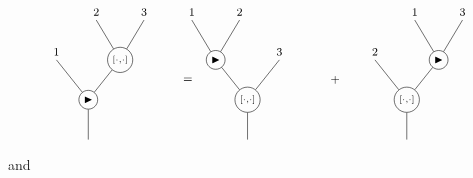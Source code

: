 \documentclass[10pt]{article}
\theoremstyle{definition}
\newcommand{\bt}{\blacktriangleright}
\begin{document}
\[
\footnotesize
\begin{tikzpicture}[scale=1]


\node[circle,draw,inner sep=2pt] (w) at (0,0) {$\bt$};

\node[circle,draw,inner sep=2pt] (b) at (0.8,1) {$\scriptstyle[\cdot,\cdot]$};

\draw (w) -- (0,-1);
\draw (-0.8,1) -- (w);
\draw (b) -- (w);
\draw (0.2,2) -- (b);
\draw (1.4,2) -- (b);

\node at (-0.8,1.2) {$1$};
\node at (0.2,2.2) {$2$};
\node at (1.4,2.2) {$3$};

\node at (2.5,0.5) {$=$};


\begin{scope}[shift={(4,0)}]

\node[circle,draw,inner sep=2pt] (b1) at (0,0) {$\scriptstyle[\cdot,\cdot]$};

\node[circle,draw,inner sep=2pt] (w1) at (-0.8,1) {$\bt$};

\draw (b1) -- (0,-1);
\draw (w1) -- (b1);
\draw (0.8,1) -- (b1);

\draw (-1.4,2) -- (w1);
\draw (-0.2,2) -- (w1);

\node at (-1.4,2.2) {$1$};
\node at (-0.2,2.2) {$2$};
\node at (0.8,1.2) {$3$};

\end{scope}

\node at (6.2,0.5) {$+$};


\begin{scope}[shift={(8,0)}]

\node[circle,draw,inner sep=2pt] (b2) at (0,0) {$\scriptstyle[\cdot,\cdot]$};

\node[circle,draw,inner sep=2pt] (w2) at (0.8,1) {$\bt$};

\draw (b2) -- (0,-1);
\draw (-0.8,1) -- (b2);
\draw (w2) -- (b2);

\draw (0.2,2) -- (w2);
\draw (1.4,2) -- (w2);

\node at (-0.8,1.2) {$2$};
\node at (0.2,2.2) {$1$};
\node at (1.4,2.2) {$3$};

\end{scope}

\end{tikzpicture}
\]
and
\end{document}
